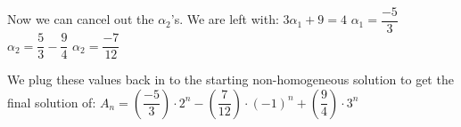 \documentclass{article}
\begin{document}
\begin{solution}
Now we can cancel out the $\alpha_2$'s. We are left with:
\newline
$3\alpha_1 + 9 = 4$
\newline
$\alpha_1 = \dfrac{-5}{3}$
\newline
$\alpha_2 = \dfrac{5}{3} - \dfrac{9}{4}$
\newline
$\alpha_2 = \dfrac{-7}{12}$
\newline

We plug these values back in to the starting non-homogeneous solution to get the final solution of:
\newline
$A_n = (\dfrac{-5}{3}) \cdot 2^n - (\dfrac{7}{12}) \cdot (-1)^n + (\dfrac{9}{4}) \cdot 3^n$

\end{solution}

\vskip 0.3in
\end{document}
